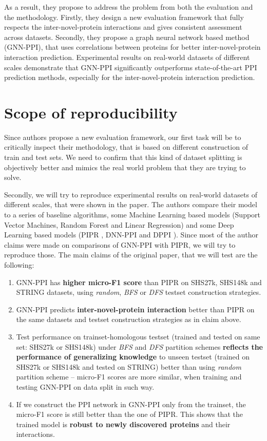 As a result, they propose to address the problem from both the evaluation and the methodology. Firstly, they design a new evaluation framework that fully respects the inter-novel-protein interactions and gives consistent assessment across datasets. Secondly, they propose a graph neural network based method (GNN-PPI), that uses correlations between proteins for better inter-novel-protein interaction prediction. Experimental results on real-world datasets of different scales demonstrate that GNN-PPI significantly outperforms state-of-the-art PPI prediction methods, especially for the inter-novel-protein interaction prediction.

\section{Scope of reproducibility}
\label{sec:claims}

Since authors propose a new evaluation framework, our first task will be to critically inspect their methodology, that is based on different construction of train and test sets. We need to confirm that this kind of dataset splitting is objectively better and mimics the real world problem that they are trying to solve.

Secondly, we will try to reproduce experimental results on real-world datasets of different scales, that were shown in the paper.
The authors compare their model to a series of baseline algorithms, some Machine Learning based models (Support Vector Machines, Random Forest and Linear Regression) and some Deep Learning based models (PIPR \cite{chen2019pipr}, DNN-PPI \cite{gui2019dnn} and DPPI \cite{hashemifar2018predicting}). Since most of the author claims were made on comparisons of GNN-PPI with PIPR, we will try to reproduce those. 
The main claims of the original paper, that we will test are the following:
\begin{enumerate}
    \item GNN-PPI has \textbf{higher micro-F1 score} than PIPR on SHS27k, SHS148k and STRING datasets, using \emph{random}, \emph{BFS} or \emph{DFS} testset construction strategies.
    \item GNN-PPI predicts \textbf{inter-novel-protein interaction} better than PIPR on the same datasets and testset construction strategies as in claim above.
    \item Test performance on trainset-homologous testset (trained and tested on same set: SHS27k or SHS148k) under \emph{BFS} and \emph{DFS} partition schemes \textbf{reflects the performance of generalizing knowledge} to unseen testset (trained on SHS27k or SHS148k and tested on STRING) better than using \emph{random} partition scheme -- micro-F1 scores are more similar, when training and testing GNN-PPI on data split in such way.
    \item If we construct the PPI network in GNN-PPI only from the trainset, the micro-F1 score is still better than the one of PIPR. This shows that the trained model is \textbf{robust to newly discovered proteins} and their interactions.
\end{enumerate}

